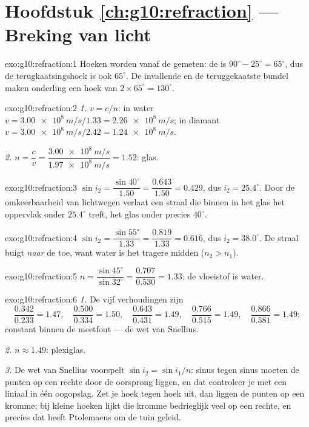 \section*{Hoofdstuk \ref{ch:g10:refraction} --- Breking van licht}

\begin{solution}{exo:g10:refraction:1}
Hoeken worden vanaf de  gemeten: de  is
$90^\circ - 25^\circ = 65^\circ$, dus de terugkaatsingshoek is ook
$65^\circ$. De invallende en de teruggekaatste bundel maken onderling een
hoek van $2 \times 65^\circ = 130^\circ$.
\end{solution}

\begin{solution}{exo:g10:refraction:2}
\emph{1.} $v = c/n$: in water
$v = \qty{3.00e8}{m/s}/1.33 = \qty{2.26e8}{m/s}$; in diamant
$v = \qty{3.00e8}{m/s}/2.42 = \qty{1.24e8}{m/s}$.

\emph{2.} $n = \dfrac{c}{v} = \dfrac{\qty{3.00e8}{m/s}}
{\qty{1.97e8}{m/s}} = 1.52$: glas.
\end{solution}

\begin{solution}{exo:g10:refraction:3}
$\sin i_2 = \dfrac{\sin 40^\circ}{1.50} = \dfrac{0.643}{1.50} = 0.429$,
dus $i_2 = 25.4^\circ$. Door de omkeerbaarheid van lichtwegen verlaat een
straal die binnen in het glas het oppervlak onder $25.4^\circ$ treft, het
glas onder precies $40^\circ$.
\end{solution}

\begin{solution}{exo:g10:refraction:4}
$\sin i_2 = \dfrac{\sin 55^\circ}{1.33} = \dfrac{0.819}{1.33} = 0.616$,
dus $i_2 = 38.0^\circ$. De straal buigt \emph{naar} de  toe, want
water is het tragere midden ($n_2 > n_1$).
\end{solution}

\begin{solution}{exo:g10:refraction:5}
$n = \dfrac{\sin 45^\circ}{\sin 32^\circ} = \dfrac{0.707}{0.530}
= 1.33$: de vloeistof is water.
\end{solution}

\begin{solution}{exo:g10:refraction:6}
\emph{1.} De vijf verhoudingen zijn
\[
\frac{0.342}{0.233} = 1.47,\quad
\frac{0.500}{0.334} = 1.50,\quad
\frac{0.643}{0.431} = 1.49,\quad
\frac{0.766}{0.515} = 1.49,\quad
\frac{0.866}{0.581} = 1.49 :
\]
constant binnen de meetfout --- de wet van Snellius.

\emph{2.} $n \approx 1.49$: plexiglas.

\emph{3.} De wet van Snellius voorspelt $\sin i_2 = \sin i_1 / n$: sinus
tegen sinus moeten de punten op een rechte door de oorsprong liggen, en
dat controleer je met een liniaal in één oogopslag. Zet je hoek tegen
hoek uit, dan liggen de punten op een kromme; bij kleine hoeken lijkt die
kromme bedrieglijk veel op een rechte, en precies dat heeft Ptolemaeus om
de tuin geleid.
\end{solution}

